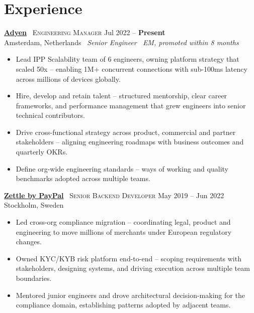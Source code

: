 \documentclass[9pt,a4paper]{article}
\newcommand{\employer}[5]{%
  \href{#5}{\textbf{#1}} \textbar\ {\small\scshape #2} \hfill {\small #3}\\[-1pt]
  {\small\color{mid} #4}%
}
\begin{document}
\begin{minipage}[t]{0.685\textwidth}
\setlength{\parskip}{0pt}

\section{Experience}

\employer{Adyen}{Engineering Manager}{Jul 2022 -- {\color{accent}\textbf{Present}}}{Amsterdam, Netherlands \textbar\ \textit{Senior Engineer \textrightarrow\ EM, promoted within 8 months}}{https://www.adyen.com}
\begin{itemize}
  \item Lead IPP Scalability team of {\color{accent}6 engineers}, owning platform strategy that scaled {\color{accent}50x} -- enabling 1M+ concurrent connections with sub-100ms latency across millions of devices globally.
  \item Hire, develop and retain talent -- structured mentorship, clear career frameworks, and performance management that grew engineers into senior technical contributors.
  \item Drive {\color{accent}cross-functional strategy} across product, commercial and partner stakeholders -- aligning engineering roadmaps with business outcomes and quarterly OKRs.
  \item Define {\color{accent}org-wide engineering standards} -- ways of working and quality benchmarks adopted across multiple teams.
\end{itemize}

\vspace{8pt}
\employer{Zettle by PayPal}{Senior Backend Developer}{May 2019 -- Jun 2022}{Stockholm, Sweden}{https://www.zettle.com/gb}
\begin{itemize}
  \item Led {\color{accent}cross-org compliance migration} -- coordinating legal, product and engineering to move millions of merchants under European regulatory changes.
  \item Owned KYC/KYB risk platform end-to-end -- scoping requirements with stakeholders, designing systems, and driving execution across {\color{accent}multiple team boundaries}.
  \item Mentored junior engineers and drove {\color{accent}architectural decision-making} for the compliance domain, establishing patterns adopted by adjacent teams.
\end{itemize}


\end{minipage}
\end{document}
